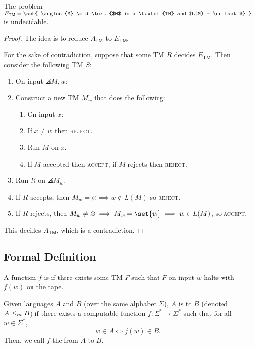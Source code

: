 \documentclass{standalone}
\begin{document}
\begin{proposition}
  The problem \(E_{\textsf{TM}} = \set{
    \angles{M} \mid \text{$M$ is a \textsf{TM} and $L(M) = \nullset$}
  }\) is undecidable.
\end{proposition}
\begin{proof}
  The idea is to reduce \(A_{\textsf{TM}}\) to \(E_{\textsf{TM}}\).

  For the sake of contradiction, suppose that some \textsf{TM} \(R\) decides \(E_{\textsf{TM}}\). Then consider the following \textsf{TM} \(S\):
  \begin{enumerate}[start=0]
    \item On input \(\angles{M, w}\):
    \item Construct a new \textsf{TM} \(M_w\) that does the following:
    \begin{enumerate}[(1), nosep, start=0]
      \item On input \(x\):
      \item If \(x \neq w\) then \textsc{reject}.
      \item Run \(M\) on \(x\).
      \item If \(M\) accepted then \textsc{accept}, if \(M\) rejects then \textsc{reject}.
    \end{enumerate}
    \item Run \(R\) on \(\angles{M_w}\).
    \item If \(R\) accepts, then \(M_w = \varnothing \implies w \notin L(M)\) so \textsc{reject}.
    \item If \(R\) rejects, then \(M_w \neq \varnothing \implies M_w = \set{w} \implies w \in L(M)\), so \textsc{accept}.
  \end{enumerate}
  This decides \(A_{\textsf{TM}}\), which is a contradiction.
\end{proof}

\subsection{Formal Definition}
\begin{definition}
  A function \(f\) is  if there exists some \textsf{TM} \(F\) such that \(F\) on input \(w\) halts with \(f(w)\) on the tape.
\end{definition}

\begin{definition}
  Given languages \(A\) and \(B\) (over the same alphabet \(\Sigma\)), \(A\) is  to \(B\) (denoted \(A \mathrel{\leq_m} B\)) if there exists a computable function \(f\colon \Sigma^* \to \Sigma^*\) such that for all \(w \in \Sigma^*\),
  \[
    w \in A \iff f(w) \in B.
  \]
  Then, we call \(f\) the  from \(A\) to \(B\).
\end{definition}
\end{document}
